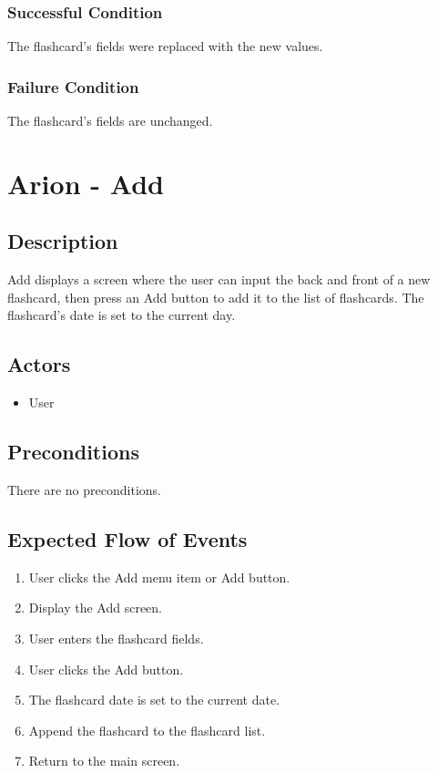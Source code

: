 \documentclass{scrreprt}
\begin{document}
    \subsection{Successful Condition}
    The flashcard's fields were replaced with the new values.
    
    \subsection{Failure Condition}
    The flashcard's fields are unchanged.

\chapter{Arion - Add}

\section{Description}
Add displays a screen where the user can input the back and front of a new flashcard,
then press an Add button to add it to the list of flashcards.
The flashcard's date is set to the current day.

\section{Actors}
\begin{itemize}
    \item User
\end{itemize}

\section{Preconditions}
    There are no preconditions.

\section{Expected Flow of Events}
\begin{enumerate}[1.]
    \item User clicks the Add menu item or Add button.
    \item Display the Add screen.
    \item User enters the flashcard fields.
    \item User clicks the Add button.
    \item The flashcard date is set to the current date.
    \item Append the flashcard to the flashcard list.
    \item Return to the main screen.
\end{enumerate}
\end{document}
